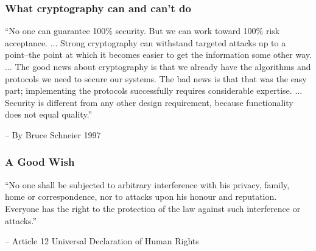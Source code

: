 \begin{frame}\frametitle{What cryptography can and can't do}
``No one can guarantee 100\% security. But we can work toward 100\% risk acceptance. $\dots$ Strong cryptography can withstand targeted attacks up to a point--the point at which it becomes easier to get the information some other way. $\dots$ The good news about cryptography is that we already have the algorithms and protocols we need to secure our systems. The bad news is that that was the easy part; implementing the protocols successfully requires considerable expertise. $\dots$  
Security is different from any other design requirement, because functionality does not equal quality.''
\newline

-- By Bruce Schneier 1997
\end{frame}
\begin{frame}\frametitle{A Good Wish}
``No one shall be subjected to arbitrary interference with his privacy, family, home or correspondence, nor to attacks upon his honour and reputation. Everyone has the right to the protection of the law against such interference or attacks.''
\newline

-- Article 12 Universal Declaration of Human Rights
\end{frame}



